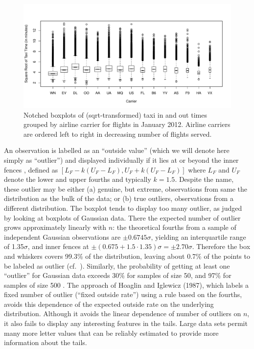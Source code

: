 \documentclass[12pt,oneside]{article}
\begin{document}
\begin{figure}[hbtp]
  \centering
  \includegraphics[width=\linewidth]{taxi-bp}

  \caption{Notched boxplots \citep{variations.boxplots} of (sqrt-transformed)
  taxi in and out times grouped by airline carrier for flights in January 2012. Airline carriers are ordered left to right in decreasing  number of flights served. }

  \label{fig:taxi-bp} 
\end{figure}

An observation is labelled as an ``outside value'' (which we will denote here
simply as ``outlier'') and displayed individually if it lies at or beyond the
inner fences \citep{eda,emerson83}, defined as $[L_F - k(U_F - L_F), U_F +
k(U_F - L_F)]$ where $L_F$ and $U_F$ denote the lower and upper fourths and
typically $k = 1.5$. Despite the name, these outlier may be either (a)
genuine, but extreme, observations from same the distribution as the bulk of
the data; or (b) true outliers, observations from a different distribution.
The boxplot tends to display too many outlier, as judged by looking at
boxplots of Gaussian data. There the expected number of outlier grows
approximately linearly with $n$: the theoretical fourths from a sample of
independent Gaussian observations are $\pm 0.6745\sigma$, yielding an
interquartile range of 1.35$\sigma$, and inner fences at $\pm (0.675 + 1.5
\cdot 1.35)\sigma = \pm 2.70\sigma$. Therefore the box and whiskers covers
99.3\% of the distribution, leaving about 0.7\% of the points to be labeled as
outlier (cf.~\citet{dchlv}). Similarly, the probability of getting at
least one ``outlier'' for Gaussian data exceeds 30\% for samples of size 50,
and 97\% for samples of size 500 \citep[pg. 1148]{dchbox}. The approach of Hoaglin and Iglewicz (1987), which labels a fixed
number of outlier (``fixed outside rate'') using a rule based
on the fourths, avoids this dependence of the expected outside rate on the 
underlying distribution.  Although it avoids the linear dependence of
number of outliers on $n$, it also fails to display any interesting
features in the tails.  Large data sets permit many more letter values
that can be reliably estimated to provide more information about the tails.
\end{document}
